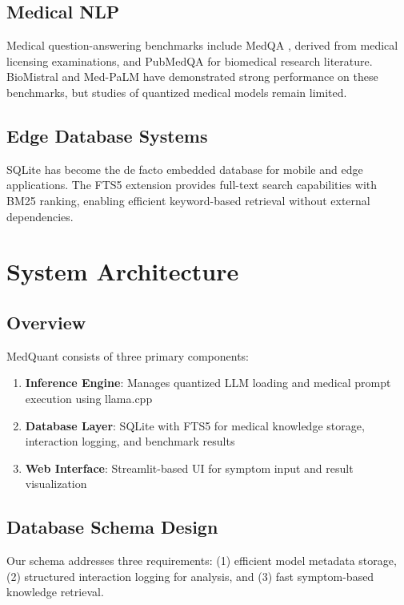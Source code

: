 \documentclass[conference]{IEEEtran}
\begin{document}
\subsection{Medical NLP}

Medical question-answering benchmarks include MedQA \cite{jin2021disease}, derived from medical licensing examinations, and PubMedQA \cite{jin2019pubmedqa} for biomedical research literature. BioMistral and Med-PaLM have demonstrated strong performance on these benchmarks, but studies of quantized medical models remain limited.

\subsection{Edge Database Systems}

SQLite has become the de facto embedded database for mobile and edge applications. The FTS5 extension provides full-text search capabilities with BM25 ranking, enabling efficient keyword-based retrieval without external dependencies.

\section{System Architecture}

\subsection{Overview}

MedQuant consists of three primary components:
\begin{enumerate}
    \item \textbf{Inference Engine}: Manages quantized LLM loading and medical prompt execution using llama.cpp
    \item \textbf{Database Layer}: SQLite with FTS5 for medical knowledge storage, interaction logging, and benchmark results
    \item \textbf{Web Interface}: Streamlit-based UI for symptom input and result visualization
\end{enumerate}

\subsection{Database Schema Design}

Our schema addresses three requirements: (1) efficient model metadata storage, (2) structured interaction logging for analysis, and (3) fast symptom-based knowledge retrieval.
\end{document}
